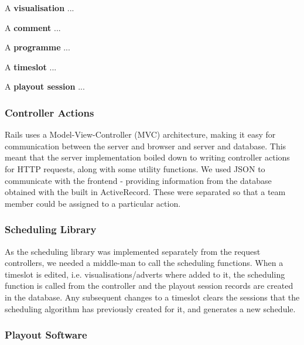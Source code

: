 \documentclass[a4paper, titlepage]{article}
\begin{document}
A \textbf{visualisation} ...

A \textbf{comment} ...

A \textbf{programme} ...

A \textbf{timeslot} ...

A \textbf{playout session} ...


\subsubsection{Controller Actions}

Rails uses a Model-View-Controller (MVC) architecture, making it easy for communication between the 
server and browser and server and database. This meant that the server implementation boiled down to
writing controller actions for HTTP requests, along with some utility functions. We used JSON to 
communicate with the frontend - providing information from the database obtained with the built in 
ActiveRecord. These were separated so that a team member could be assigned to a particular action.   



\subsubsection{Scheduling Library}


As the scheduling library was implemented separately from the request controllers,
we needed a middle-man to call the scheduling functions. When a timeslot is edited, i.e. 
visualisations/adverts where added to it, the scheduling function is called from
the controller and the playout session records are created in the database. Any 
subsequent changes to a timeslot clears the sessions that the scheduling algorithm 
has previously created for it, and generates a new schedule. 

\subsubsection{Playout Software}

\end{document}
